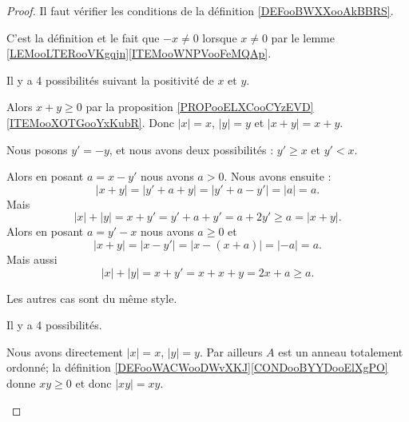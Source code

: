 \begin{proof}
	Il faut vérifier les conditions de la définition \ref{DEFooBWXXooAkBBRS}.
	\begin{subproof}
		\spitem[\( | x |=0\) si et seulement si \( x=0\)]
		C'est la définition et le fait que \( -x\neq 0\) lorsque \( x\neq 0\) par le lemme \ref{LEMooLTERooVKgqjn}\ref{ITEMooWNPVooFeMQAp}.

		\spitem[\( | x+y |\leq | x |+| y |\)]
		Il y a 4 possibilités suivant la positivité de \( x\) et \( y\).
		\begin{subproof}
			\spitem[Si \( x,y\geq 0\)]
			Alors \( x+y\geq 0\) par la proposition \ref{PROPooELXCooCYzEVD}\ref{ITEMooXOTGooYxKubR}. Donc \( | x |=x\), \( | y |=y\) et \( | x+y |=x+y\).

			\spitem[Si \( x\geq 0\) et \( y<0\)]
			Nous posons \( y'=-y\), et nous avons deux possibilités : \( y'\geq x\) et \( y'<x\).
			\begin{subproof}
				\spitem[Si \( y'<x\)]
				Alors en posant \( a=x-y'\) nous avons \( a>0\). Nous avons ensuite :
				\begin{equation}
					| x+y |=| y'+a+y |=| y'+a-y' |=| a |=a.
				\end{equation}
				Mais
				\begin{equation}
					| x |+| y |=x+y'=y'+a+y'=a+2y'\geq a=| x+y |.
				\end{equation}
				\spitem[Si \( y'\geq x\)]
				Alors en posant \( a=y'-x\) nous avons \( a\geq 0\) et
				\begin{equation}
					| x+y |=| x-y' |=| x-(x+a) |=| -a |=a.
				\end{equation}
				Mais aussi
				\begin{equation}
					| x |+| y |=x+y'=x+x+y=2x+a\geq a.
				\end{equation}
			\end{subproof}
			Les autres cas sont du même style.
		\end{subproof}

		\spitem[\( | xy |=| x || y |\)]

		Il y a 4 possibilités.
		\begin{subproof}
			\spitem[Si \( x,y\geq 0\)]
			Nous avons directement \( | x |=x\), \( | y |=y\). Par ailleurs \( A\) est un anneau totalement ordonné; la définition \ref{DEFooWACWooDWvXKJ}\ref{CONDooBYYDooElXgPO} donne \( xy\geq 0\) et donc \( | xy |=xy\).


\end{subproof}
\end{subproof}
\end{proof}

